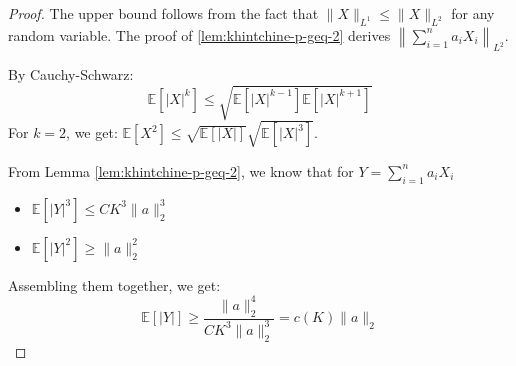\documentclass{article}
\theoremstyle{remark}
\newcommand{\Exp}{\mathbb{E}}
\begin{document}
\begin{proof}
The upper bound follows from the fact that \(\|X\|_{L^{1}} \leq \|X\|_{L^{2}}\) for any random variable. The proof of \ref{lem:khintchine-p-geq-2} derives \(\left\|\sum\limits_{i=1}^{n} a_{i}X_{i}\right\|_{L^{2}}\).

By Cauchy-Schwarz:
\begin{equation*}
\Exp[|X|^{k}] \leq \sqrt{\Exp[|X|^{k - 1}]\Exp[|X|^{k + 1}]}
\end{equation*}
For \(k = 2\), we get: \(\Exp[X^{2}] \leq \sqrt{\Exp[|X|]} \sqrt{\Exp[|X|^{3}]}\).

From Lemma \ref{lem:khintchine-p-geq-2}, we know that for \(Y = \sum\limits_{i=1}^{n}a_{i}X_{i}\)
\begin{itemize}
\item \(\Exp[|Y|^{3}] \leq CK^{3}\|a\|_{2}^{3}\)
\item \(\Exp[|Y|^{2}] \geq \|a\|_{2}^{2}\)
\end{itemize}

Assembling them together, we get:
\begin{equation*}
\Exp[|Y|] \geq \frac{\|a\|_{2}^{4}}{CK^{3}\|a\|_{2}^{3}} = c(K)\|a\|_{2}
\end{equation*}
\end{proof}

\newpage


\end{document}
